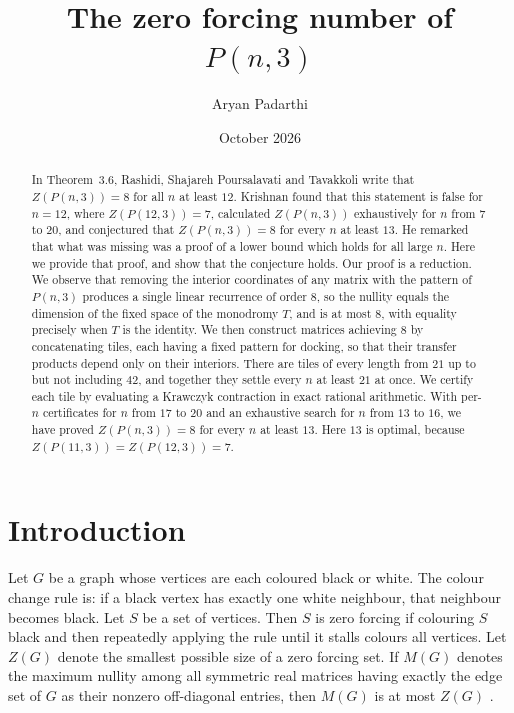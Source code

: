 \documentclass[11pt]{article}
\title{The zero forcing number of $P(n,3)$}
\author{Aryan Padarthi}
\date{October 2026}
\theoremstyle{definition}
\begin{document}
\maketitle

\begin{abstract}
In Theorem~3.6, Rashidi, Shajareh Poursalavati and Tavakkoli write that
$Z(P(n,3))=8$ for all $n$ at least $12$. Krishnan found that this statement is
false for $n=12$, where $Z(P(12,3))=7$, calculated $Z(P(n,3))$ exhaustively for
$n$ from $7$ to $20$, and conjectured that $Z(P(n,3))=8$ for every $n$ at least
$13$. He remarked that what was missing was a proof of a lower bound which holds
for all large $n$. Here we provide that proof, and show that the conjecture
holds.
Our proof is a reduction. We observe that removing the interior coordinates of
any matrix with the pattern of $P(n,3)$ produces a single linear recurrence of
order $8$, so the nullity equals the dimension of the fixed space of the
monodromy $T$, and is at most $8$, with equality precisely when $T$ is the
identity.
We then construct matrices achieving $8$ by concatenating tiles, each having a
fixed pattern for docking, so that their transfer products depend only on their
interiors. There are tiles of every length from $21$ up to but not including
$42$, and together they settle every $n$ at least $21$ at once. We certify each
tile by evaluating a Krawczyk contraction in exact rational arithmetic. With
per-$n$ certificates for $n$ from $17$ to $20$ and an exhaustive search for $n$
from $13$ to $16$, we have proved $Z(P(n,3))=8$ for every $n$ at least $13$.
Here $13$ is optimal, because $Z(P(11,3))=Z(P(12,3))=7$.
\end{abstract}

\section{Introduction}

Let $G$ be a graph whose vertices are each coloured black or white. The colour
change rule is: if a black vertex has exactly one white neighbour, that
neighbour becomes black. Let $S$ be a set of vertices. Then $S$ is zero forcing
if colouring $S$ black and then repeatedly applying the rule until it stalls
colours all vertices. Let $Z(G)$ denote the smallest possible size of a zero
forcing set. If $M(G)$ denotes the maximum nullity among all symmetric real
matrices having exactly the edge set of $G$ as their nonzero off-diagonal
entries, then $M(G)$ is at most $Z(G)$ \cite{aim}.
\end{document}
